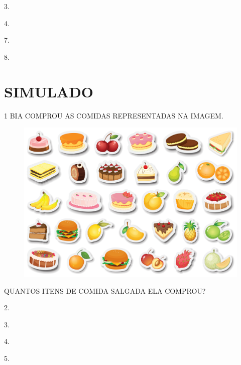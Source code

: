 \begin{multicols}{4}
\begin{escolha}
\item 3.

\item 4.

\item 7.

\item 8.
\end{escolha}
\end{multicols}


\chapter[SIMULADO 4]{SIMULADO}

\num{1} BIA COMPROU AS COMIDAS REPRESENTADAS
NA IMAGEM.

\begin{figure}[H]
\centering
\includegraphics[width=\textwidth]{./media/SAEB_1ANO_MAT_FIGURA136.png}
\end{figure}

QUANTOS ITENS DE COMIDA SALGADA ELA COMPROU?

\begin{multicols}{4}
\begin{escolha}[itemsep=0pt]
\item 2.

\item 3.

\item 4.

\item 5.
\end{escolha}
\end{multicols}

